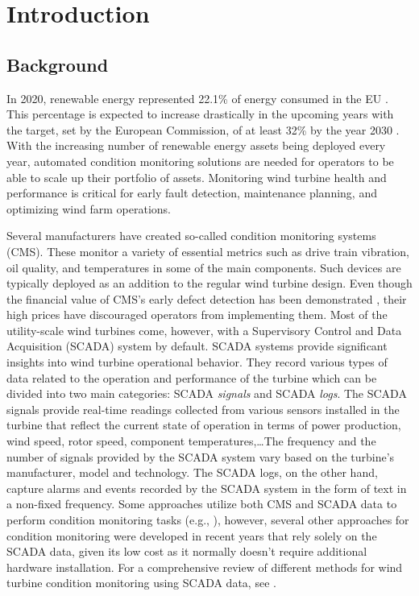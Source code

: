 \chapter{Introduction}
\label{chap:intro}
\minitoc

\section{Background}
In 2020, renewable energy represented 22.1\% of energy consumed in the EU \cite{Renewable_energy_statistics}. This percentage is 
expected to increase drastically in the upcoming years with the target, set by
the European Commission, of at least 32\% by the year 2030 \cite{Renewable_energy_targets}. With the increasing number
of renewable energy assets being deployed every year, automated condition monitoring
solutions are needed for operators to be able to scale up their portfolio of assets.
Monitoring wind turbine health and performance is critical for early fault detection, maintenance planning, and 
optimizing wind farm operations. 
\par Several manufacturers have created so-called condition monitoring systems (CMS). 
These monitor a variety of essential metrics such as drive train vibration, oil quality, and temperatures in some of 
the main components. Such devices are typically deployed as an addition to the regular wind turbine design.
Even though the financial value of CMS's early defect detection has been demonstrated \cite{CMS}, 
their high prices \cite{CMS_Costs} have discouraged operators from implementing them.
Most of the utility-scale wind turbines come, however, with a Supervisory Control and Data Acquisition (SCADA) system by default.
SCADA systems provide significant insights into wind turbine operational behavior. 
They record various types of data related to 
the operation and performance of the turbine which can be divided into two main categories: SCADA \emph{signals} and SCADA \emph{logs}.
The SCADA signals provide real-time readings collected from various sensors installed in the turbine that reflect the current state of operation 
in terms of power production, wind speed, rotor speed, component temperatures,\dots The frequency and the number of signals provided by the SCADA system 
vary based on the turbine's manufacturer, model and technology. The SCADA logs, on the other hand, capture alarms and events recorded by the SCADA 
system in the form of text in a non-fixed frequency.
Some approaches utilize both CMS and SCADA data to perform condition monitoring tasks (e.g., \cite{CMSSCADA}), however, 
several other approaches for condition monitoring were developed in recent years that rely solely on the
SCADA data, given its low cost as it normally doesn't require additional hardware installation. For a comprehensive review 
of different methods for wind turbine condition monitoring using SCADA data, see \cite{SCADA_NBM_Review}.

